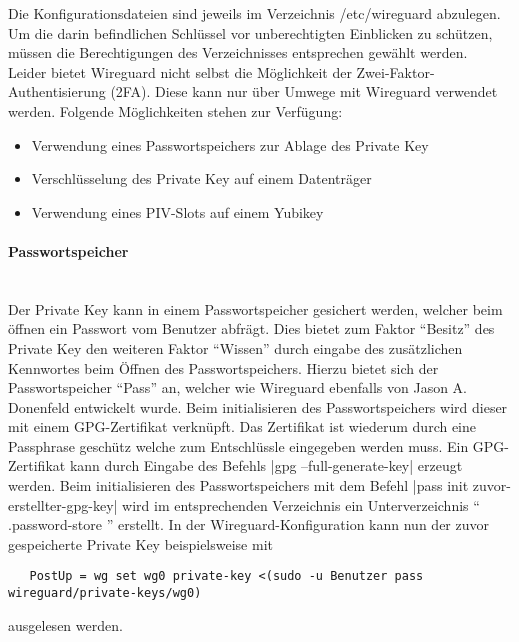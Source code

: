 \newpage
\noindent Die Konfigurationsdateien sind jeweils im Verzeichnis /etc/wireguard abzulegen. Um die darin befindlichen Schl\"ussel vor unberechtigten Einblicken zu sch\"utzen, m\"ussen die Berechtigungen des Verzeichnisses entsprechen gew\"ahlt werden. \\

\noindent Leider bietet Wireguard nicht selbst die M\"oglichkeit der Zwei-Faktor-Authentisierung (2FA). Diese kann nur \"uber Umwege mit Wireguard verwendet werden. Folgende M\"oglichkeiten stehen zur Verf\"ugung:
   \begin{itemize}
      \item Verwendung eines Passwortspeichers zur Ablage des Private Key
      \item Verschl\"usselung des Private Key auf einem Datentr\"ager
			\item Verwendung eines PIV-Slots auf einem Yubikey
   \end{itemize}

\paragraph{Passwortspeicher} 
\noindent \\Der Private Key kann in einem Passwortspeicher gesichert werden, welcher beim \"offnen ein Passwort vom Benutzer abfr\"agt. Dies bietet zum Faktor "`Besitz"' des Private Key den weiteren Faktor "`Wissen"' durch eingabe des zus\"atzlichen Kennwortes beim \"Offnen des Passwortspeichers. Hierzu bietet sich der Passwortspeicher "`Pass"' an, welcher wie Wireguard ebenfalls von Jason A. Donenfeld entwickelt wurde. Beim initialisieren des Passwortspeichers wird dieser mit einem GPG-Zertifikat verknüpft. Das Zertifikat ist wiederum durch eine Passphrase gesch\"utz welche zum Entschlüssle eingegeben werden muss.
Ein GPG-Zertifikat kann durch Eingabe des Befehls |gpg --full-generate-key| erzeugt werden. Beim initialisieren des Passwortspeichers mit dem Befehl |pass init zuvor-erstellter-gpg-key| wird im entsprechenden Verzeichnis ein Unterverzeichnis \enquote{ .password-store } erstellt. In der Wireguard-Konfiguration kann nun der zuvor gespeicherte Private Key beispielsweise mit 
\begin{verbatim}
   PostUp = wg set wg0 private-key <(sudo -u Benutzer pass wireguard/private-keys/wg0)
\end{verbatim}
ausgelesen werden.

